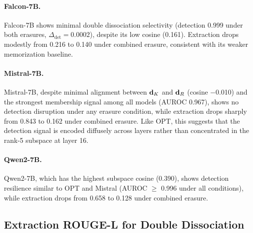 \paragraph{Falcon-7B.}
Falcon-7B shows minimal double dissociation selectivity (detection 0.999 under both erasures, $\Delta_{\mathrm{det}} = 0.0002$), despite its low cosine (0.161).
Extraction drops modestly from 0.216 to 0.140 under combined erasure, consistent with its weaker memorization baseline.

\paragraph{Mistral-7B.}
Mistral-7B, despite minimal alignment between $\mathbf{d}_K$ and $\mathbf{d}_R$ (cosine $-$0.010) and the strongest membership signal among all models (AUROC 0.967), shows no detection disruption under any erasure condition, while extraction drops sharply from 0.843 to 0.162 under combined erasure.
Like OPT, this suggests that the detection signal is encoded diffusely across layers rather than concentrated in the rank-5 subspace at layer 16.

\paragraph{Qwen2-7B.}
Qwen2-7B, which has the highest subspace cosine (0.390), shows detection resilience similar to OPT and Mistral (AUROC $\geq$ 0.996 under all conditions), while extraction drops from 0.658 to 0.128 under combined erasure.

\subsection{Extraction ROUGE-L for Double Dissociation}
\label{app:dd_extraction}

\begin{table}[!htbp]
\centering
\caption{Double dissociation, extraction ROUGE-L under four erasure conditions.
Both erasures reduce extraction across all models.
GPT-Neo-2.7B is omitted because baseline detection is at chance.}
\label{tab:dd_extraction}
\end{table}

